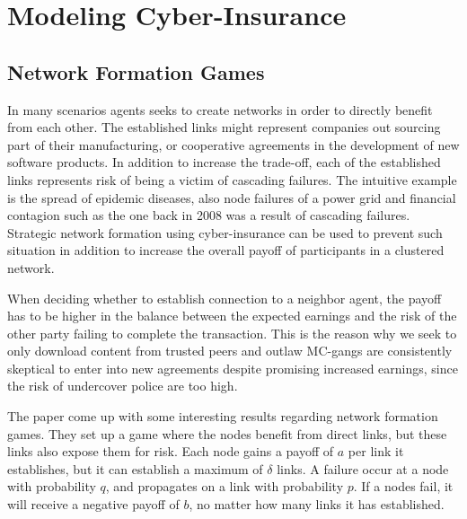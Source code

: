 \chapter{Modeling Cyber-Insurance }
\label{chp:modelingCyberInsurance} 


\section{Network Formation Games}


In many scenarios agents seeks to create networks in order to directly benefit from each other. The established links might represent companies out sourcing part of their manufacturing, or cooperative agreements in the development of new software products. In addition to increase the trade-off, each of the established links represents risk of being a victim of cascading failures. The intuitive example is the spread of epidemic diseases, also node failures of a power grid and financial contagion such as the one back in 2008 was a result of cascading failures. Strategic network formation using cyber-insurance can be used to prevent such situation in addition to increase the overall payoff of participants in a clustered network.


When deciding whether to establish connection to a neighbor agent, the payoff has to be higher in the balance between the expected earnings and the risk of the other party failing to complete the transaction. This is the reason why we seek to only download content from trusted peers and outlaw MC-gangs are consistently skeptical to enter into new agreements despite promising increased earnings, since the risk of undercover police are too high. 


The paper \cite{contagion} come up with some interesting results regarding network formation games. 
They set up a game where the nodes benefit from direct links, but these links also expose them for risk. 
Each node gains a payoff of  $a$ per link it establishes, but it can establish a maximum of $\delta$ links.
A failure occur at a node with probability $q$, and propagates on a link with probability $p$. If a nodes fail, it will receive a negative payoff of $b$, no matter how many links it has established.

